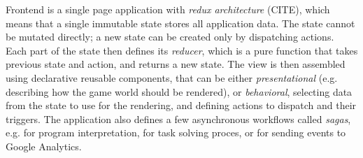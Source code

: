 Frontend is a single page application with \emph{redux architecture} (CITE),
which means that a single immutable state stores all application data.
The state cannot be mutated directly; a new state can be created only
by dispatching actions.
Each part of the state then defines its \emph{reducer},
which is a pure function that takes previous state and action, and returns a new state.
The view is then assembled using declarative reusable components, that can
be either \emph{presentational} (e.g. describing how the game world should be
rendered), or \emph{behavioral}, selecting data from the state to use for
the rendering, and defining actions to dispatch and their triggers.
The application also defines a few asynchronous workflows called \emph{sagas},
e.g. for program interpretation, for task solving proces, or for sending events to
Google Analytics.  %
%


